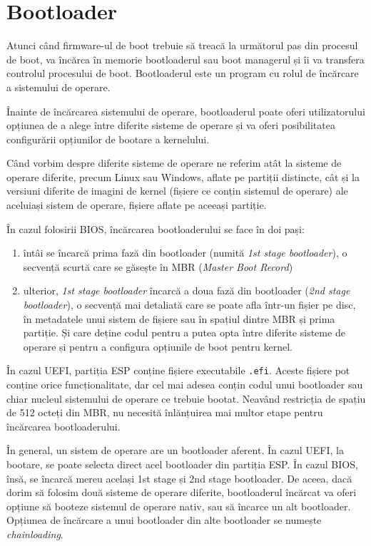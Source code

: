 \section{Bootloader}
\label{sec:boot:bootloader}

Atunci când firmware-ul de boot trebuie să treacă la următorul pas din procesul de boot, va încărca în memorie bootloaderul sau boot managerul și îi va transfera controlul procesului de boot.
Bootloaderul este un program cu rolul de încărcare a sistemului de operare.

Înainte de încărcarea sistemului de operare, bootloaderul poate oferi utilizatorului opțiunea de a alege între diferite sisteme de operare și va oferi posibilitatea configurării opțiunilor de bootare a kernelului.

Când vorbim despre diferite sisteme de operare ne referim atât la sisteme de operare diferite, precum Linux sau Windows, aflate pe partiții distincte, cât și la versiuni diferite de imagini de kernel (fișiere ce conțin sistemul de operare) ale aceluiași sistem de operare, fișiere aflate pe aceeași partiție.

În cazul folosirii BIOS, încărcarea bootloaderului se face în doi pași:

\begin{enumerate}
  \item întâi se încarcă prima fază din bootloader (numită \textit{1st stage bootloader}), o secvență scurtă care se găsește în MBR (\textit{Master Boot Record})
  \item ulterior, \textit{1st stage bootloader} încarcă a doua fază din bootloader (\textit{2nd stage bootloader}), o secvență mai detaliată care se poate afla într-un fișier pe disc, în metadatele unui sistem de fișiere sau în spațiul dintre MBR și prima partiție.
    Și care deține codul pentru a putea opta între diferite sisteme de operare și pentru a configura opțiunile de boot pentru kernel.
\end{enumerate}

În cazul UEFI, partiția ESP conține fișiere executabile \texttt{.efi}.
Aceste fișiere pot conține orice funcționalitate, dar cel mai adesea conțin codul unui bootloader sau chiar nucleul sistemului de operare ce trebuie bootat.
 Neavând restricția de spațiu de 512 octeți din MBR, nu necesită înlănțuirea mai multor etape pentru încărcarea bootloaderului.

În general, un sistem de operare are un bootloader aferent.
În cazul UEFI, la bootare, se poate selecta direct acel bootloader din partiția ESP.
În cazul BIOS, însă, se încarcă mereu același 1st stage și 2nd stage bootloader.
De aceea, dacă dorim să folosim două sisteme de operare diferite, bootloaderul încărcat va oferi opțiune să booteze sistemul de operare nativ, sau să încarce un alt bootloader.
Opțiunea de încărcare a unui bootloader din alte bootloader se numește \textit{chainloading}.

